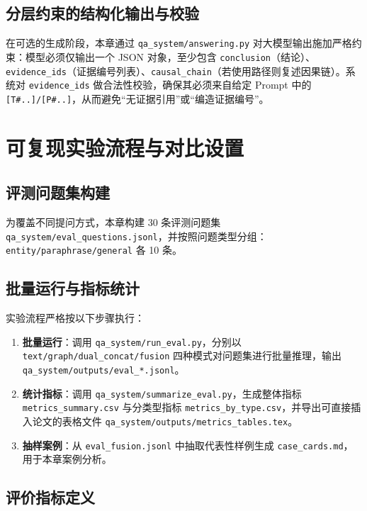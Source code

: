 \subsection{分层约束的结构化输出与校验}
\label{subsec:structured_answer}

在可选的生成阶段，本章通过 \texttt{qa\_system/answering.py} 对大模型输出施加严格约束：模型必须仅输出一个 JSON 对象，至少包含 \texttt{conclusion}（结论）、\texttt{evidence\_ids}（证据编号列表）、\texttt{causal\_chain}（若使用路径则复述因果链）。系统对 \texttt{evidence\_ids} 做合法性校验，确保其必须来自给定 Prompt 中的 \texttt{[T\#..]/[P\#..]}，从而避免“无证据引用”或“编造证据编号”。

\section{可复现实验流程与对比设置}
\label{sec:repro_protocol}

\subsection{评测问题集构建}
\label{subsec:evalset}

为覆盖不同提问方式，本章构建 30 条评测问题集 \texttt{qa\_system/eval\_questions.jsonl}，并按照问题类型分组：\texttt{entity/paraphrase/general} 各 10 条。

\subsection{批量运行与指标统计}
\label{subsec:batch_eval}

实验流程严格按以下步骤执行：
\begin{enumerate}
  \item \textbf{批量运行}：调用 \texttt{qa\_system/run\_eval.py}，分别以 \texttt{text/graph/dual\_concat/fusion} 四种模式对问题集进行批量推理，输出 \texttt{qa\_system/outputs/eval\_*.jsonl}。
  \item \textbf{统计指标}：调用 \texttt{qa\_system/summarize\_eval.py}，生成整体指标 \texttt{metrics\_summary.csv} 与分类型指标 \texttt{metrics\_by\_type.csv}，并导出可直接插入论文的表格文件 \texttt{qa\_system/outputs/metrics\_tables.tex}。
  \item \textbf{抽样案例}：从 \texttt{eval\_fusion.jsonl} 中抽取代表性样例生成 \texttt{case\_cards.md}，用于本章案例分析。
\end{enumerate}

\subsection{评价指标定义}
\label{subsec:metrics}


